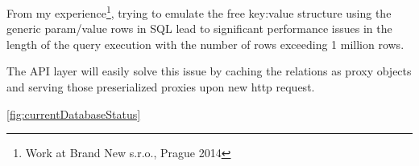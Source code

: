 \par From my experience\footnote{Work at Brand New s.r.o., Prague 2014}, trying to emulate the free key:value structure using the generic param/value rows in SQL lead to significant performance issues in the length of the query execution with the number of rows exceeding 1 million rows.

\par The API layer will easily solve this issue by caching the relations as proxy objects and serving those preserialized proxies upon new http request.
	



\ref{fig:currentDatabaseStatus}

